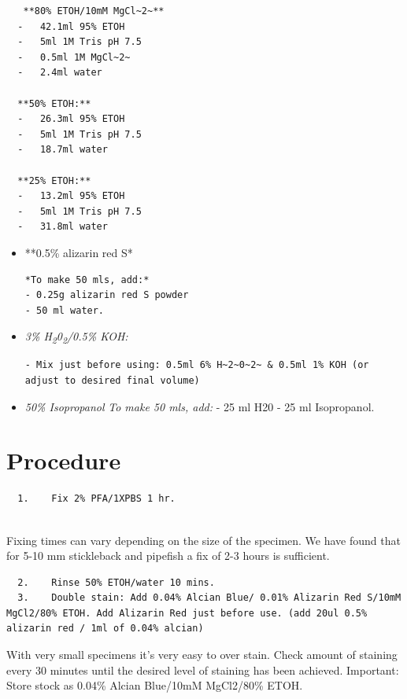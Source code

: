 \documentclass[
  letterpaper,
  DIV=11,
  numbers=noendperiod]{scrreprt}
\begin{document}
\begin{verbatim}
   **80% ETOH/10mM MgCl~2~**
  -   42.1ml 95% ETOH
  -   5ml 1M Tris pH 7.5
  -   0.5ml 1M MgCl~2~
  -   2.4ml water
  
  **50% ETOH:**
  -   26.3ml 95% ETOH
  -   5ml 1M Tris pH 7.5
  -   18.7ml water
  
  **25% ETOH:**
  -   13.2ml 95% ETOH
  -   5ml 1M Tris pH 7.5
  -   31.8ml water
\end{verbatim}

\begin{itemize}
\item
  **0.5\% alizarin red S*

\begin{verbatim}
*To make 50 mls, add:*
- 0.25g alizarin red S powder 
- 50 ml water.
\end{verbatim}
\item
  \emph{3\% H\textsubscript{2}0\textsubscript{2}/0.5\% KOH:}

\begin{verbatim}
- Mix just before using: 0.5ml 6% H~2~0~2~ & 0.5ml 1% KOH (or adjust to desired final volume)
\end{verbatim}
\item
  \emph{50\% Isopropanol} \emph{To make 50 mls, add:} - 25 ml H20 - 25
  ml Isopropanol.
\end{itemize}

\hypertarget{procedure-67}{%
\section{Procedure}\label{procedure-67}}

\begin{verbatim}
  1.    Fix 2% PFA/1XPBS 1 hr.
  
\end{verbatim}

Fixing times can vary depending on the size of the specimen. We have
found that for 5-10 mm stickleback and pipefish a fix of 2-3 hours is
sufficient.

\begin{verbatim}
  2.    Rinse 50% ETOH/water 10 mins.
  3.    Double stain: Add 0.04% Alcian Blue/ 0.01% Alizarin Red S/10mM MgCl2/80% ETOH. Add Alizarin Red just before use. (add 20ul 0.5% alizarin red / 1ml of 0.04% alcian)
\end{verbatim}

With very small specimens it's very easy to over stain. Check amount of
staining every 30 minutes until the desired level of staining has been
achieved. Important: Store stock as 0.04\% Alcian Blue/10mM MgCl2/80\%
ETOH.
\end{document}
